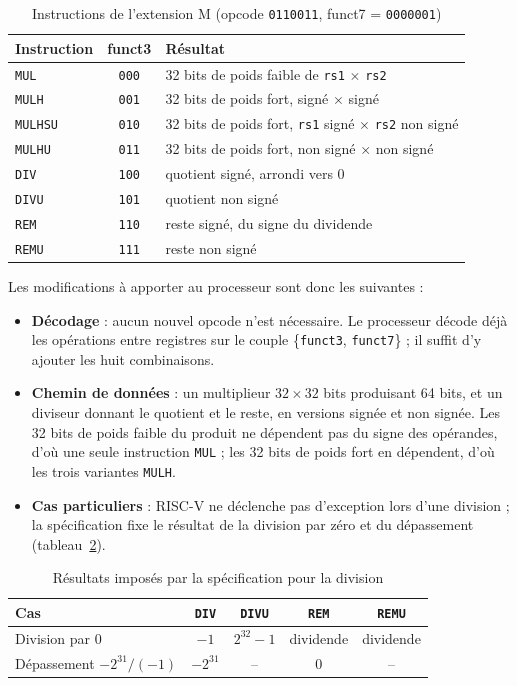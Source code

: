 \begin{table}[H]
\centering
\begin{tabular}{lcl}
\toprule
Instruction & funct3 & Résultat \\
\midrule
\texttt{MUL}    & \texttt{000} & 32 bits de poids faible de \texttt{rs1} $\times$ \texttt{rs2} \\
\texttt{MULH}   & \texttt{001} & 32 bits de poids fort, signé $\times$ signé \\
\texttt{MULHSU} & \texttt{010} & 32 bits de poids fort, \texttt{rs1} signé $\times$ \texttt{rs2} non signé \\
\texttt{MULHU}  & \texttt{011} & 32 bits de poids fort, non signé $\times$ non signé \\
\texttt{DIV}    & \texttt{100} & quotient signé, arrondi vers 0 \\
\texttt{DIVU}   & \texttt{101} & quotient non signé \\
\texttt{REM}    & \texttt{110} & reste signé, du signe du dividende \\
\texttt{REMU}   & \texttt{111} & reste non signé \\
\bottomrule
\end{tabular}
\caption{Instructions de l'extension M (opcode \texttt{0110011}, funct7 = \texttt{0000001})}
\label{tab:rv32m}
\end{table}

Les modifications à apporter au processeur sont donc les suivantes :
\begin{itemize}
\item \textbf{Décodage} : aucun nouvel opcode n'est nécessaire. Le processeur décode déjà les
opérations entre registres sur le couple \{\texttt{funct3}, \texttt{funct7}\} ; il suffit d'y
ajouter les huit combinaisons.
\item \textbf{Chemin de données} : un multiplieur $32 \times 32$ bits produisant 64 bits, et un
diviseur donnant le quotient et le reste, en versions signée et non signée. Les 32 bits de poids
faible du produit ne dépendent pas du signe des opérandes, d'où une seule instruction
\texttt{MUL} ; les 32 bits de poids fort en dépendent, d'où les trois variantes \texttt{MULH}.
\item \textbf{Cas particuliers} : RISC-V ne déclenche pas d'exception lors d'une division ; la
spécification fixe le résultat de la division par zéro et du dépassement
(tableau~\ref{tab:div0}).
\end{itemize}

\begin{table}[H]
\centering
\begin{tabular}{lcccc}
\toprule
Cas & \texttt{DIV} & \texttt{DIVU} & \texttt{REM} & \texttt{REMU} \\
\midrule
Division par 0 & $-1$ & $2^{32}-1$ & dividende & dividende \\
Dépassement $-2^{31} / (-1)$ & $-2^{31}$ & -- & 0 & -- \\
\bottomrule
\end{tabular}
\caption{Résultats imposés par la spécification pour la division}
\label{tab:div0}
\end{table}

